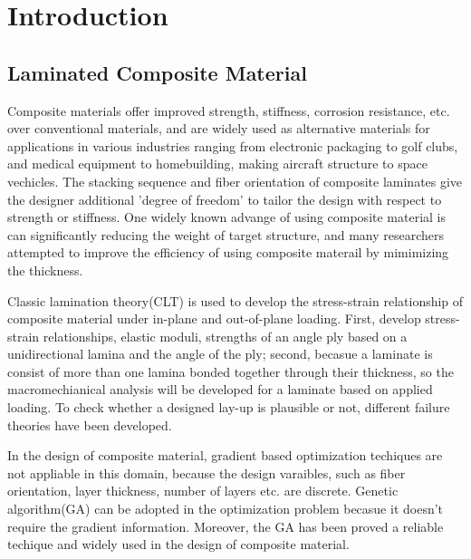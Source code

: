 
\chapter{Introduction} %

\label{Chapter1} %


\section{Laminated Composite Material}

Composite materials offer improved strength, stiffness, corrosion resistance,
etc. over conventional materials, and are widely used as alternative materials
for applications in various industries ranging from electronic packaging to golf
clubs, and medical equipment to homebuilding, making aircraft structure to space
vechicles. The stacking sequence and fiber orientation of composite laminates
give the designer additional 'degree of freedom' to tailor the design with
respect to strength or stiffness.  One widely known advange of using composite
material is can significantly reducing the weight of target structure, and many
researchers attempted to improve the efficiency of using composite materail by
mimimizing the thickness.

Classic lamination theory(CLT) is used to develop the stress-strain relationship of
composite material under in-plane and out-of-plane loading. First, develop
stress-strain relationships, elastic moduli, strengths of an angle ply based on
a unidirectional lamina and the angle of the ply; second, becasue a laminate is
consist of more than one lamina bonded together through their thickness, so the
macromechianical analysis will be developed for a laminate based on applied
loading.  To check whether a designed lay-up is plausible or not, different
failure theories have been developed.






In the design of composite material, gradient based optimization techiques are
not appliable in this domain, because the design varaibles, such as fiber
orientation, layer thickness, number of layers etc. are discrete. Genetic
algorithm(GA) can be adopted in the optimization problem becasue it doesn't require
the gradient information. Moreover, the GA has been proved a reliable techique
and widely used in the design of composite material. 

